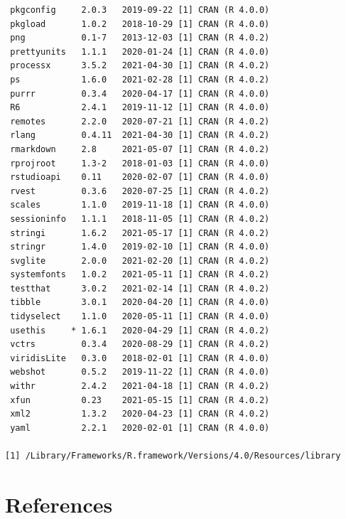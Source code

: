 \documentclass [11pt, proquest] {uwthesis}[2015/03/03]
\begin{document}
\begin{verbatim}
 pkgconfig     2.0.3   2019-09-22 [1] CRAN (R 4.0.0)                       
 pkgload       1.0.2   2018-10-29 [1] CRAN (R 4.0.0)                       
 png           0.1-7   2013-12-03 [1] CRAN (R 4.0.2)                       
 prettyunits   1.1.1   2020-01-24 [1] CRAN (R 4.0.0)                       
 processx      3.5.2   2021-04-30 [1] CRAN (R 4.0.2)                       
 ps            1.6.0   2021-02-28 [1] CRAN (R 4.0.2)                       
 purrr         0.3.4   2020-04-17 [1] CRAN (R 4.0.0)                       
 R6            2.4.1   2019-11-12 [1] CRAN (R 4.0.0)                       
 remotes       2.2.0   2020-07-21 [1] CRAN (R 4.0.2)                       
 rlang         0.4.11  2021-04-30 [1] CRAN (R 4.0.2)                       
 rmarkdown     2.8     2021-05-07 [1] CRAN (R 4.0.2)                       
 rprojroot     1.3-2   2018-01-03 [1] CRAN (R 4.0.0)                       
 rstudioapi    0.11    2020-02-07 [1] CRAN (R 4.0.0)                       
 rvest         0.3.6   2020-07-25 [1] CRAN (R 4.0.2)                       
 scales        1.1.0   2019-11-18 [1] CRAN (R 4.0.0)                       
 sessioninfo   1.1.1   2018-11-05 [1] CRAN (R 4.0.2)                       
 stringi       1.6.2   2021-05-17 [1] CRAN (R 4.0.2)                       
 stringr       1.4.0   2019-02-10 [1] CRAN (R 4.0.0)                       
 svglite       2.0.0   2021-02-20 [1] CRAN (R 4.0.2)                       
 systemfonts   1.0.2   2021-05-11 [1] CRAN (R 4.0.2)                       
 testthat      3.0.2   2021-02-14 [1] CRAN (R 4.0.2)                       
 tibble        3.0.1   2020-04-20 [1] CRAN (R 4.0.0)                       
 tidyselect    1.1.0   2020-05-11 [1] CRAN (R 4.0.0)                       
 usethis     * 1.6.1   2020-04-29 [1] CRAN (R 4.0.2)                       
 vctrs         0.3.4   2020-08-29 [1] CRAN (R 4.0.2)                       
 viridisLite   0.3.0   2018-02-01 [1] CRAN (R 4.0.0)                       
 webshot       0.5.2   2019-11-22 [1] CRAN (R 4.0.0)                       
 withr         2.4.2   2021-04-18 [1] CRAN (R 4.0.2)                       
 xfun          0.23    2021-05-15 [1] CRAN (R 4.0.2)                       
 xml2          1.3.2   2020-04-23 [1] CRAN (R 4.0.2)                       
 yaml          2.2.1   2020-02-01 [1] CRAN (R 4.0.0)                       

[1] /Library/Frameworks/R.framework/Versions/4.0/Resources/library
\end{verbatim}
\backmatter

\chapter*{References}\label{references}
\end{document}
